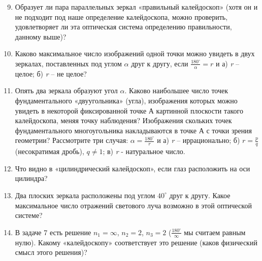\documentclass[a4paper, 11pt]{article}
\begin{document}
\begin{minipage}[t]{0.6\textwidth}
\begin{enumerate}
            \setcounter{enumi}{8}
            \item Образует ли пара параллельных зеркал «правильный калейдоскоп» (хотя он и не подходит под наше определение калейдоскопа, можно проверить, удовлетворяет ли эта оптическая система определению правильности, данному выше)?
            \item Каково максимальное число изображений одной точки можно увидеть в двух зеркалах, поставленных под углом $\alpha$ друг к другу, если $\frac{180^\circ}{\alpha} = r$ и а) \textit{r} -- целое; б) \textit{r} -- не целое?
            \item Опять два зеркала образуют угол $\alpha$. Каково наибольшее число точек фундаментального «двуугольника» (угла), изображения которых можно увидеть в некоторой фиксированной точке А картинной плоскости такого калейдоскопа, меняя точку наблюдения? Изображения скольких точек фундаментального многоугольника накладываются в точке А с точки зрения геометрии? Рассмотрите три случая: $\alpha = \frac{180^\circ}{r}$ и а) \textit{r} -- иррационально; б) $r= \frac{p}{q}$ (несократимая дробь), $q \neq 1$; в) \textit{r} - натуральное число.
            \item Что видно в «цилиндрический калейдоскоп», если глаз расположить на оси цилиндра?
            \item Два плоских зеркала расположены под углом $40^\circ$ друг к другу. Какое максимальное число отражений светового луча возможно в этой оптической системе?
            \item В задаче 7 есть решение $n_1 = \infty$, $n_2 = 2$, $n_3 = 2$ ($\frac{180^\circ}{\infty}$ мы считаем равным нулю). Какому «калейдоскопу» соответствует это решение (каков физический смысл этого решения)?
        \end{enumerate} 
    \end{minipage}
    \indent
\end{document}
